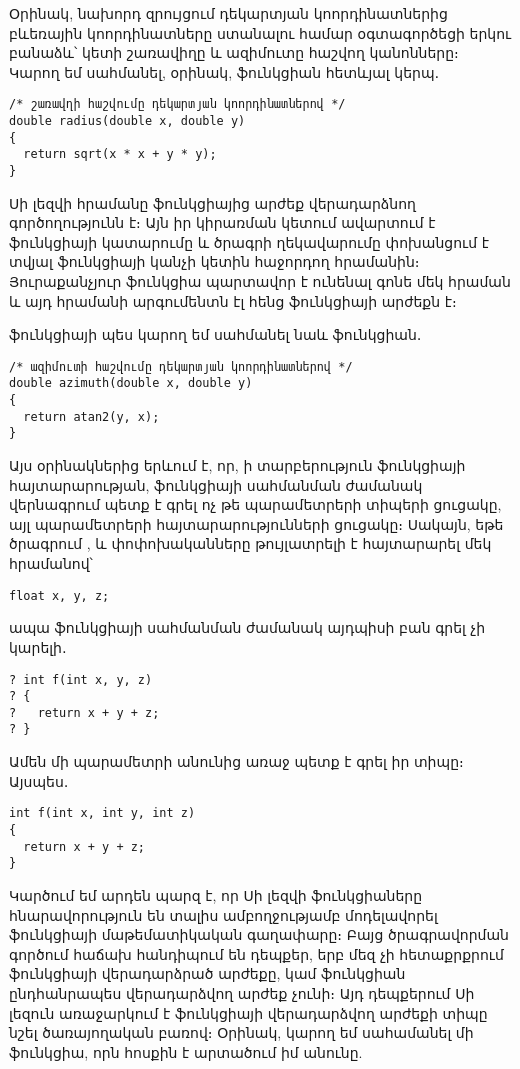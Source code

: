 Օրինակ, նախորդ զրույցում դեկարտյան
կոորդինատներից բևեռային կոորդինատները ստանալու համար օգտագործեցի երկու
բանաձև՝ կետի շառավիղը և ազիմուտը հաշվող կանոնները։ Կարող եմ սահմանել,
օրինակ,  ֆունկցիան հետևյալ կերպ․

\begin{Verbatim}
/* շառավղի հաշվումը դեկարտյան կոորդինատներով */
double radius(double x, double y)
{
  return sqrt(x * x + y * y);
}
\end{Verbatim}

Սի լեզվի  հրամանը ֆունկցիայից արժեք
վերադարձնող գործողությունն է։ Այն իր կիրառման կետում ավարտում է
ֆունկցիայի կատարումը և ծրագրի ղեկավարումը փոխանցում է տվյալ ֆունկցիայի
կանչի կետին հաջորդող հրամանին։ Յուրաքանչյուր ֆունկցիա պարտավոր է ունենալ
գոնե մեկ  հրաման և այդ հրամանի արգումենտն էլ հենց
ֆունկցիայի արժեքն է։

 ֆունկցիայի պես կարող եմ սահմանել նաև 
ֆունկցիան․

\begin{Verbatim}
/* ազիմուտի հաշվումը դեկարտյան կոորդինատներով */
double azimuth(double x, double y)
{
  return atan2(y, x);
}
\end{Verbatim}

Այս օրինակներից երևում է, որ, ի տարբերություն ֆունկցիայի հայտարարության,
ֆունկցիայի սահմանման ժամանակ վերնագրում պետք է գրել ոչ թե պարամետրերի տիպերի
ցուցակը, այլ պարամետրերի հայտարարությունների ցուցակը։ Սակայն, եթե ծրագրում
,  և  փոփոխականները թույլատրելի է հայտարարել
մեկ հրամանով՝

\begin{Verbatim}
float x, y, z;
\end{Verbatim}

ապա ֆունկցիայի սահմանման ժամանակ այդպիսի բան գրել չի կարելի․

\begin{Verbatim}
? int f(int x, y, z)
? {
?   return x + y + z;
? }
\end{Verbatim}

Ամեն մի պարամետրի անունից առաջ պետք է գրել իր տիպը։ Այսպես․

\begin{Verbatim}
int f(int x, int y, int z)
{
  return x + y + z;
}
\end{Verbatim}

Կարծում եմ արդեն պարզ է, որ Սի լեզվի ֆունկցիաները հնարավորություն են տալիս
ամբողջությամբ մոդելավորել ֆունկցիայի մաթեմատիկական գաղափարը։ Բայց ծրագրավորման
գործում հաճախ հանդիպում են դեպքեր, երբ մեզ չի հետաքրքրում ֆունկցիայի
վերադարձրած արժեքը, կամ ֆունկցիան ընդհանրապես վերադարձվող արժեք չունի։ Այդ
դեպքերում Սի լեզուն առաջարկում է ֆունկցիայի վերադարձվող արժեքի տիպը նշել
 ծառայողական բառով։ Օրինակ, կարող եմ սահամանել մի
ֆունկցիա, որն  հոսքին է արտածում իմ անունը.

